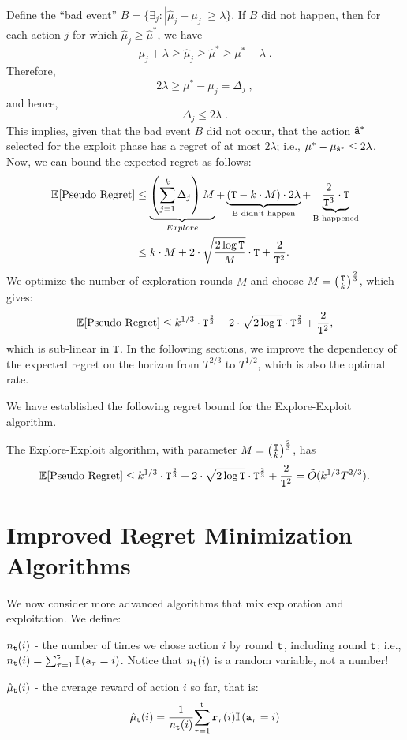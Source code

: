 Define the ``bad event''
$B=\{\exists_{j}:\left|\hat{\mu}_{j}-\mu_{j}\right|\ge\lambda\}$. If
$B$ did not happen, then for each action $j$ for which
$\hat{\mu}_{j}\ge\hat{\mu}^{*}$, we have
\[
\mu_{j}+\lambda\ge\hat{\mu}_{j}\ge\hat{\mu}^{*}\ge\mu^{*}-\lambda\;.
\]
Therefore,
\[
2\lambda\ge\mu^{*}-\mu_{j}=\Delta_{j}\;,
\]
and hence,
\[
\Delta_{j}\le2\lambda\;.
\]
This implies, given that the bad event $B$ did not occur,
that the action $\hat{{\tt a}}^*$ selected for the exploit phase has a regret of at most $2\lambda$; i.e., $\mu^*-\mu_{\hat{{\tt a}}^*}\leq 2\lambda$.
Now, we can bound the expected regret as follows:
\begin{align*}
\mathbb{E}[\text{Pseudo Regret}] & \leq  \underbrace{\left({\displaystyle
\sum_{j=1}^{k}\Delta_{j}}\right)M}_{Explore}+\underbrace{\left({\tt T}-k\cdot
M\right)\cdot2\lambda}_{\text{B didn't
happen}}+\underbrace{\frac{2}{{\tt T}^{3}}\cdot {\tt T}}_{\text{B happened}}\\
 & \leq  k\cdot M+2\cdot\sqrt{\frac{2\log {\tt T}}{M}}\cdot {\tt T}+\frac{2}{{\tt T}^{2}}.
\end{align*}
We optimize the number of exploration rounds $M$ and choose $M=\left(\frac{{\tt T}}{k}\right)^{\frac{2}{3}}$, which gives:
\[
\mathbb{E}[\text{Pseudo Regret}]  \leq 
k^{1/3}\cdot {\tt T}^{\frac{2}{3}}+2\cdot\sqrt{2\log {\tt T}}\cdot
{\tt T}^{\frac{2}{3}}+\frac{2}{{\tt T}^{2}},
\]
which is sub-linear in ${\tt T}$. In the following sections, we improve the dependency of the expected  regret on the horizon from $T^{2/3}$ to $T^{1/2}$, which is also the optimal rate.

We have established the following regret bound for the Explore-Exploit algorithm.
\begin{theorem}
    The Explore-Exploit algorithm, with parameter $M=\left(\frac{{\tt T}}{k}\right)^{\frac{2}{3}}$, has
    \[
\mathbb{E}[\text{Pseudo Regret}]  \leq 
k^{1/3}\cdot {\tt T}^{\frac{2}{3}}+2\cdot\sqrt{2\log {\tt T}}\cdot
{\tt T}^{\frac{2}{3}}+\frac{2}{{\tt T}^{2}}=\Tilde{O} (k^{1/3}T^{2/3}).
\]
\end{theorem}

\section{Improved Regret Minimization Algorithms}

We now consider more advanced algorithms that mix  exploration and exploitation.
We define:
\begin{description}
    \item[] 
$n_{{\tt t}}(i)$ - the number of times we chose action $i$ by round ${\tt t}$, including round ${\tt t}$; i.e., $n_{{\tt t}}(i)=\sum_{\tau=1}^{{\tt t}}\mathbb{I}\left({\tt a}_{\tau}=i\right)$. Notice that $n_{{\tt t}}(i)$ is a random variable, not a number!

\item
$\hat{\mu}_{{\tt t}}(i)$ - the average reward of action $i$ so far, that
is:
\[
\hat{\mu}_{{\tt t}}(i)=\frac{1}{n_{{\tt t}}(i)}{\displaystyle
\sum_{\tau=1}^{{\tt t}}{\tt r}_{\tau}(i)}\mathbb{I}\left({\tt a}_{\tau}=i\right)
\]
\end{description}

